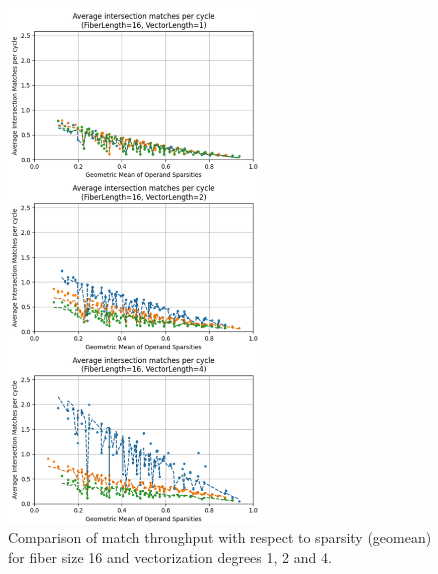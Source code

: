 \begin{figure}[H]
    \centering
    \includegraphics[width=0.6\textwidth]{figures/isect_model_fl16_vl1.pdf}
    \caption{Comparison of match throughput with respect to sparsity (geomean) for fiber size 16 and vectorization degrees 1, 2 and 4.}
    \label{fig:isect_model_fl16_vl1}
\end{figure}

\clearpage

